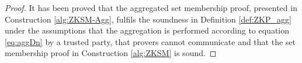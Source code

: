 \begin{proof}
It has been proved that the aggregated set membership proof, presented in Construction \ref{alg:ZKSM-Agg}, fulfils the soundness in Definition \ref{def:ZKP_agg} under the assumptions that the aggregation is performed according to equation \eqref{eq:aggDn} by a trusted party, that provers cannot communicate and that the set membership proof in Construction \ref{alg:ZKSM} is sound. 

\end{proof}


